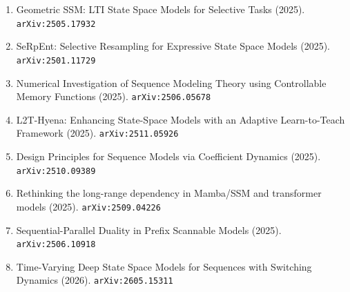 \documentclass[11pt]{article}
\begin{document}
\begin{enumerate}
  \item Geometric SSM: LTI State Space Models for Selective Tasks (2025). \texttt{arXiv:2505.17932}
  \item SeRpEnt: Selective Resampling for Expressive State Space Models (2025). \texttt{arXiv:2501.11729}
  \item Numerical Investigation of Sequence Modeling Theory using Controllable Memory Functions (2025). \texttt{arXiv:2506.05678}
  \item L2T-Hyena: Enhancing State-Space Models with an Adaptive Learn-to-Teach Framework (2025). \texttt{arXiv:2511.05926}
  \item Design Principles for Sequence Models via Coefficient Dynamics (2025). \texttt{arXiv:2510.09389}
  \item Rethinking the long-range dependency in Mamba/SSM and transformer models (2025). \texttt{arXiv:2509.04226}
  \item Sequential-Parallel Duality in Prefix Scannable Models (2025). \texttt{arXiv:2506.10918}
  \item Time-Varying Deep State Space Models for Sequences with Switching Dynamics (2026). \texttt{arXiv:2605.15311}
\end{enumerate}
\end{document}
